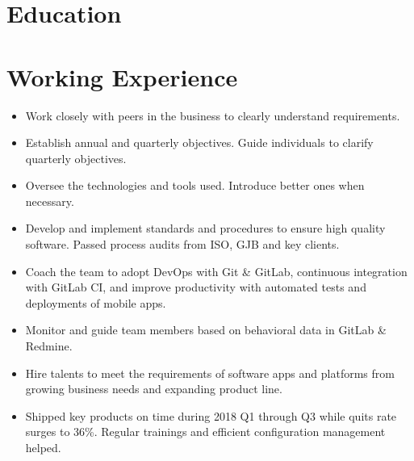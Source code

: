 \documentclass[11pt,a4paper]{moderncv}
\begin{document}
\maketitle



\section{Education}

\section{Working Experience}

{
\begin{itemize}
	\item Work closely with peers in the business to clearly understand requirements.
	\item Establish annual and quarterly objectives. Guide individuals to clarify quarterly objectives.
	\item Oversee the technologies and tools used. Introduce better ones when necessary.
	\item Develop and implement standards and procedures to ensure high quality software. Passed process audits from ISO, GJB and key clients.
	\item Coach the team to adopt DevOps with Git \& GitLab, continuous integration with GitLab CI, and improve productivity with automated tests and deployments of mobile apps.
	\item Monitor and guide team members based on behavioral data in GitLab \& Redmine.
	\item Hire talents to meet the requirements of software apps and platforms from growing business needs and expanding product line.
	\item Shipped key products on time during 2018 Q1 through Q3 while quits rate surges to 36\%. Regular trainings and efficient configuration management helped.
\end{itemize}
}
\end{document}
